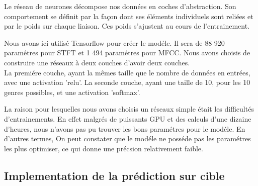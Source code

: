 \documentclass[10pt]{article}
\begin{document}
Le réseau de neurones décompose nos données en coches d'abstraction. Son comportement se définit par la façon dont ses éléments individuels sont reliées et par le poids sur chaque liaison. Ces poids s'ajustent au cours de l'entrainement. 

Nous avons ici utilisé Tensorflow pour créer le modéle. Il sera de 88 920 paramétres pour STFT et 1 494 paramétres pour MFCC. Nous avons choisis de construire une réseaux à deux couches d'avoir deux couches.\\
La premiére couche, ayant la mêmes taille que le nombre de données en entrées, avec une activation 'relu'. La seconde couche, ayant une taille de 10, pour les 10 genres possibles, et une activation 'softmax'.

La raison pour lesquelles nous avons choisis un réseaux simple était les difficultés d'entrainements. En effet malgrés de puissants GPU et des calculs d'une dizaine d'heures, nous n'avons pas pu trouver les bons paramétres pour le modéle. En d'autres termes, On peut constater que le modéle ne posséde pas les paramétres les plus optimiser, ce qui donne une précsion relativement faible.

\subsection{Implementation de la prédiction sur cible}
\end{document}
